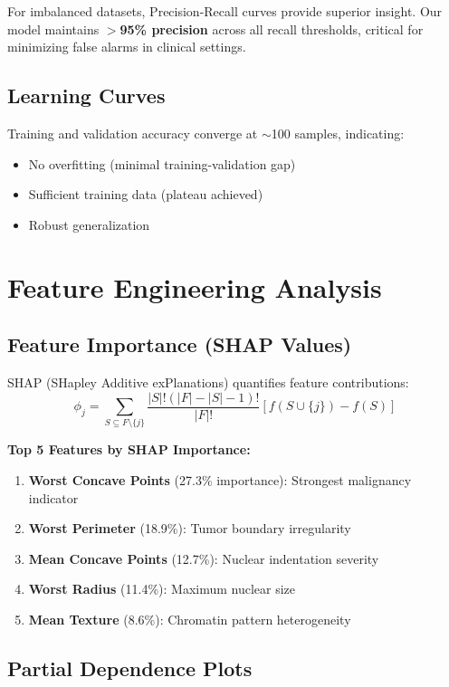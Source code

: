 \documentclass[11pt,a4paper]{article}
\begin{document}
For imbalanced datasets, Precision-Recall curves provide superior insight. Our model maintains \textbf{$>$95\% precision} across all recall thresholds, critical for minimizing false alarms in clinical settings.

\subsection{Learning Curves}

Training and validation accuracy converge at $\sim$100 samples, indicating:
\begin{itemize}
    \item No overfitting (minimal training-validation gap)
    \item Sufficient training data (plateau achieved)
    \item Robust generalization
\end{itemize}

\section{Feature Engineering Analysis}

\subsection{Feature Importance (SHAP Values)}

SHAP (SHapley Additive exPlanations) \citep{lundberg2017shap} quantifies feature contributions:
\begin{equation}
\phi_j = \sum_{S \subseteq F \setminus \{j\}} \frac{|S|! (|F| - |S| - 1)!}{|F|!} [f(S \cup \{j\}) - f(S)]
\end{equation}

\textbf{Top 5 Features by SHAP Importance:}
\begin{enumerate}
    \item \textbf{Worst Concave Points} (27.3\% importance): Strongest malignancy indicator
    \item \textbf{Worst Perimeter} (18.9\%): Tumor boundary irregularity
    \item \textbf{Mean Concave Points} (12.7\%): Nuclear indentation severity
    \item \textbf{Worst Radius} (11.4\%): Maximum nuclear size
    \item \textbf{Mean Texture} (8.6\%): Chromatin pattern heterogeneity
\end{enumerate}

\subsection{Partial Dependence Plots}
\end{document}
